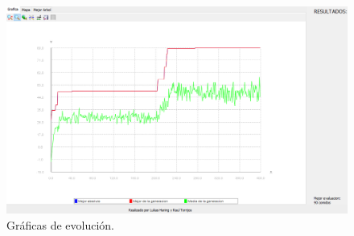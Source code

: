 \documentclass{article}
\begin{document}
\begin{figure}[h]
	\centering
	\includegraphics[scale=0.35]{./images/3fin3.png}
	\caption{Gráficas de evolución.}
\end{figure}
\end{document}
